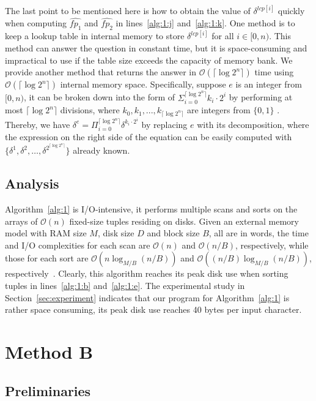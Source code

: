 \documentclass[10pt,journal,compsoc]{IEEEtran}
\begin{document}
The last point to be mentioned here is how to obtain the value of $\delta^{lcp[i]}$ quickly when computing $\hat{fp_1}$ and $\hat{fp_2}$ in lines~\ref{alg:1:j} and~\ref{alg:1:k}. One method is to keep a lookup table in internal memory to store $\delta^{lcp[i]}$ for all $i \in [0, n)$. This method can answer the question in constant time, but it is space-consuming and 
impractical to use if the table size exceeds the capacity of memory bank. We provide another method that returns the answer in $\mathcal{O}(\lceil \log2^n \rceil)$ time using $\mathcal{O}(\lceil \log2^n \rceil)$ internal memory space. Specifically, suppose $e$ is an integer from $[0, n)$, it can be broken down into the form of $\Sigma_{i = 0}^{\lceil \log2^n \rceil}{k_i \cdot 2^i}$ by performing at most $\lceil \log2^n \rceil$ divisions, where $k_0, k_1, ..., k_{\lceil \log2^n \rceil}$ are integers from $\{0, 1\}$ . Thereby, we have $\delta^e = \Pi_{i = 0}^{\lceil \log2^n \rceil}{\delta}^{k_i \cdot 2^i}$ by replacing $e$ with its decomposition, where the expression on the right side of the equation can be easily computed with $\{{\delta}^{1}, {\delta}^{2}, \dots, {\delta}^{2^{\lceil \log2^n \rceil}} \}$ already known.

\subsection{Analysis} \label{sec:method1:analysis}


Algorithm~\ref{alg:1} is I/O-intensive, it performs multiple scans and sorts on the arrays of $\mathcal{O}(n)$ fixed-size tuples residing on disks. Given an external memory model with RAM size $M$, disk size $D$ and block size $B$, all are in words, the time and I/O complexities for each scan are $\mathcal{O}(n)$ and $\mathcal{O}(n / B)$, respectively, while those for each sort are $\mathcal{O}(n\log_{M/ B}(n / B))$ and $\mathcal{O}((n / B)\log_{M / B}(n / B))$, respectively~\cite{Arge2013}. Clearly, this algorithm reaches its peak disk use when sorting tuples in lines~\ref{alg:1:b} and~\ref{alg:1:e}. The experimental study in Section~\ref{sec:experiment} indicates that our program for Algorithm~\ref{alg:1} is rather space consuming, its peak disk use reaches 40 bytes per input character.

\section{Method B} \label{sec:method2}

\subsection{Preliminaries} \label{sec:method2:preliminaries}
\end{document}
